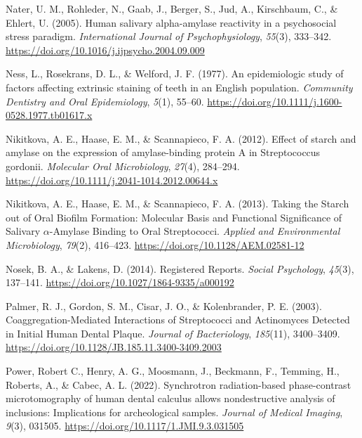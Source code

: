 \documentclass[
  b5paper,
]{book}
\newlength{\cslhangindent}
\newlength{\cslentryspacingunit} %
\newenvironment{CSLReferences}[2] %
 {%
  \setlength{\parindent}{0pt}
  \ifodd #1
  \let\oldpar\par
  \def\par{\hangindent=\cslhangindent\oldpar}
  \fi
  \setlength{\parskip}{#2\cslentryspacingunit}
 }%
 {}
\begin{document}
\begin{CSLReferences}{1}{0}
\leavevmode{}%
Nater, U. M., Rohleder, N., Gaab, J., Berger, S., Jud, A., Kirschbaum,
C., \& Ehlert, U. (2005). Human salivary alpha-amylase reactivity in a
psychosocial stress paradigm. \emph{International Journal of
Psychophysiology}, \emph{55}(3), 333--342.
\url{https://doi.org/10.1016/j.ijpsycho.2004.09.009}

\leavevmode{}%
Ness, L., Rosekrans, D. L., \& Welford, J. F. (1977). An epidemiologic
study of factors affecting extrinsic staining of teeth in an {English}
population. \emph{Community Dentistry and Oral Epidemiology},
\emph{5}(1), 55--60.
\url{https://doi.org/10.1111/j.1600-0528.1977.tb01617.x}

\leavevmode{}%
Nikitkova, A. E., Haase, E. M., \& Scannapieco, F. A. (2012). Effect of
starch and amylase on the expression of amylase-binding protein {A} in
{Streptococcus} gordonii. \emph{Molecular Oral Microbiology},
\emph{27}(4), 284--294.
\url{https://doi.org/10.1111/j.2041-1014.2012.00644.x}

\leavevmode{}%
Nikitkova, A. E., Haase, E. M., \& Scannapieco, F. A. (2013). Taking the
{Starch} out of {Oral Biofilm Formation}: {Molecular Basis} and
{Functional Significance} of {Salivary} {\(\alpha\)}-{Amylase Binding}
to {Oral Streptococci}. \emph{Applied and Environmental Microbiology},
\emph{79}(2), 416--423. \url{https://doi.org/10.1128/AEM.02581-12}

\leavevmode{}%
Nosek, B. A., \& Lakens, D. (2014). Registered {Reports}. \emph{Social
Psychology}, \emph{45}(3), 137--141.
\url{https://doi.org/10.1027/1864-9335/a000192}

\leavevmode{}%
Palmer, R. J., Gordon, S. M., Cisar, J. O., \& Kolenbrander, P. E.
(2003). Coaggregation-{Mediated Interactions} of {Streptococci} and
{Actinomyces Detected} in {Initial Human Dental Plaque}. \emph{Journal
of Bacteriology}, \emph{185}(11), 3400--3409.
\url{https://doi.org/10.1128/JB.185.11.3400-3409.2003}

\leavevmode{}%
Power, Robert C., Henry, A. G., Moosmann, J., Beckmann, F., Temming, H.,
Roberts, A., \& Cabec, A. L. (2022). Synchrotron radiation-based
phase-contrast microtomography of human dental calculus allows
nondestructive analysis of inclusions: Implications for archeological
samples. \emph{Journal of Medical Imaging}, \emph{9}(3), 031505.
\url{https://doi.org/10.1117/1.JMI.9.3.031505}


\end{CSLReferences}
\end{document}
